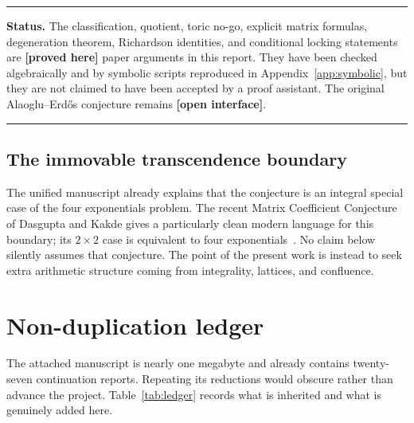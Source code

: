 \documentclass[11pt,oneside]{article}
\theoremstyle{definition}
\theoremstyle{remark}
\newcommand{\AEname}{Alaoglu--Erd\H{o}s}
\newcommand{\paperproof}{\textcolor{proofgreen}{\textbf{[proved here]}}}
\newcommand{\openstatus}{\textcolor{openviolet}{\textbf{[open interface]}}}
\newenvironment{statusbox}[1]
{\begin{center}\begin{minipage}{0.94\textwidth}\raggedright\hbadness=10000\hrule
\vspace{0.45em}\textbf{Status.} #1\par\vspace{0.35em}}
{\vspace{0.35em}\hrule\end{minipage}\end{center}}
\begin{document}
\begin{statusbox}{The classification, quotient, toric no-go, explicit matrix formulas,
degeneration theorem, Richardson identities, and conditional locking statements are
\paperproof{} paper arguments in this report.  They have been checked algebraically and by
symbolic scripts reproduced in Appendix~\ref{app:symbolic}, but they are not claimed to have
been accepted by a proof assistant.  The original \AEname{} conjecture remains \openstatus{}.}
\end{statusbox}

\subsection{The immovable transcendence boundary}

The unified manuscript already explains that the conjecture is an integral special case of the
four exponentials problem.  The recent Matrix Coefficient Conjecture of Dasgupta and
Kakde gives a particularly clean modern language for this boundary; its $2\times2$ case is
equivalent to four exponentials~\cite{DasguptaKakde}.  No claim below silently assumes that
conjecture.  The point of the present work is instead to seek extra arithmetic structure coming
from integrality, lattices, and confluence.

\section{Non-duplication ledger}
\label{sec:ledger}

The attached manuscript is nearly one megabyte and already contains twenty-seven
continuation reports.  Repeating its reductions would obscure rather than advance the project.
Table~\ref{tab:ledger} records what is inherited and what is genuinely added here.
\end{document}
